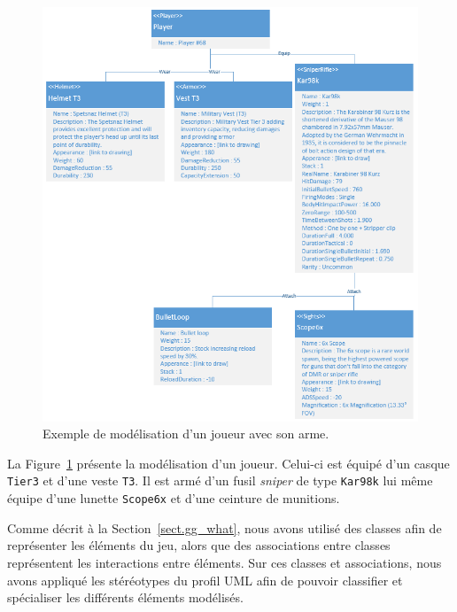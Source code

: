 \begin{figure}
    \centering
    \includegraphics[width=14cm]{10_img/chap6/player68.PNG} 
    \caption{Exemple de modélisation d'un joueur avec son arme.}
    \label{fig.player+weapon+equip}
\end{figure}

La Figure~\ref{fig.player+weapon+equip} présente la modélisation d'un joueur.
Celui-ci est équipé d'un casque \texttt{Tier3} et d'une veste \texttt{T3}. 
Il est armé d'un fusil \emph{sniper} de type \texttt{Kar98k} lui même équipe d'une lunette \texttt{Scope6x} et d'une ceinture de munitions.

Comme décrit \`a la Section~\ref{sect.gg_what}, nous avons utilisé des classes afin de représenter les éléments du jeu, alors que des associations entre classes représentent les interactions entre éléments.
Sur ces classes et associations, nous avons appliqué les stéréotypes du profil UML afin de pouvoir classifier et spécialiser les différents éléments modélisés.



